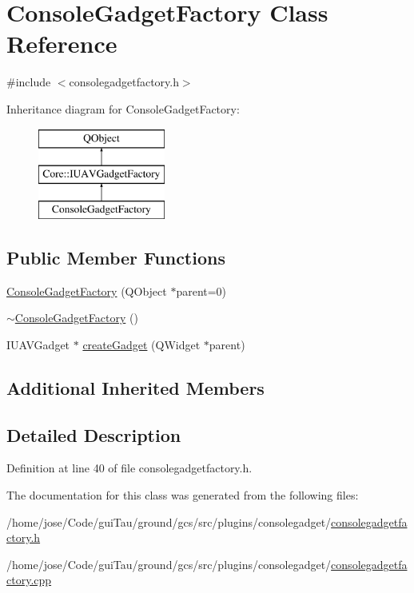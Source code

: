 \hypertarget{class_console_gadget_factory}{\section{Console\-Gadget\-Factory Class Reference}
\label{class_console_gadget_factory}
}


{\ttfamily \#include $<$consolegadgetfactory.\-h$>$}

Inheritance diagram for Console\-Gadget\-Factory\-:\begin{figure}[H]
\begin{center}
\leavevmode
\includegraphics[height=3.000000cm]{class_console_gadget_factory}
\end{center}
\end{figure}
\subsection*{Public Member Functions}
\begin{DoxyCompactItemize}
\item 
\hyperlink{group___console_plugin_ga77777adade86473e7c810b2e0a64e5b0}{Console\-Gadget\-Factory} (Q\-Object $\ast$parent=0)
\item 
\hyperlink{group___console_plugin_ga906d7deb3783cbcb35b88c42eb8be4d8}{$\sim$\-Console\-Gadget\-Factory} ()
\item 
I\-U\-A\-V\-Gadget $\ast$ \hyperlink{group___console_plugin_gac39d102639ab8db1917e47e48338487b}{create\-Gadget} (Q\-Widget $\ast$parent)
\end{DoxyCompactItemize}
\subsection*{Additional Inherited Members}


\subsection{Detailed Description}


Definition at line 40 of file consolegadgetfactory.\-h.



The documentation for this class was generated from the following files\-:\begin{DoxyCompactItemize}
\item 
/home/jose/\-Code/gui\-Tau/ground/gcs/src/plugins/consolegadget/\hyperlink{consolegadgetfactory_8h}{consolegadgetfactory.\-h}\item 
/home/jose/\-Code/gui\-Tau/ground/gcs/src/plugins/consolegadget/\hyperlink{consolegadgetfactory_8cpp}{consolegadgetfactory.\-cpp}\end{DoxyCompactItemize}
